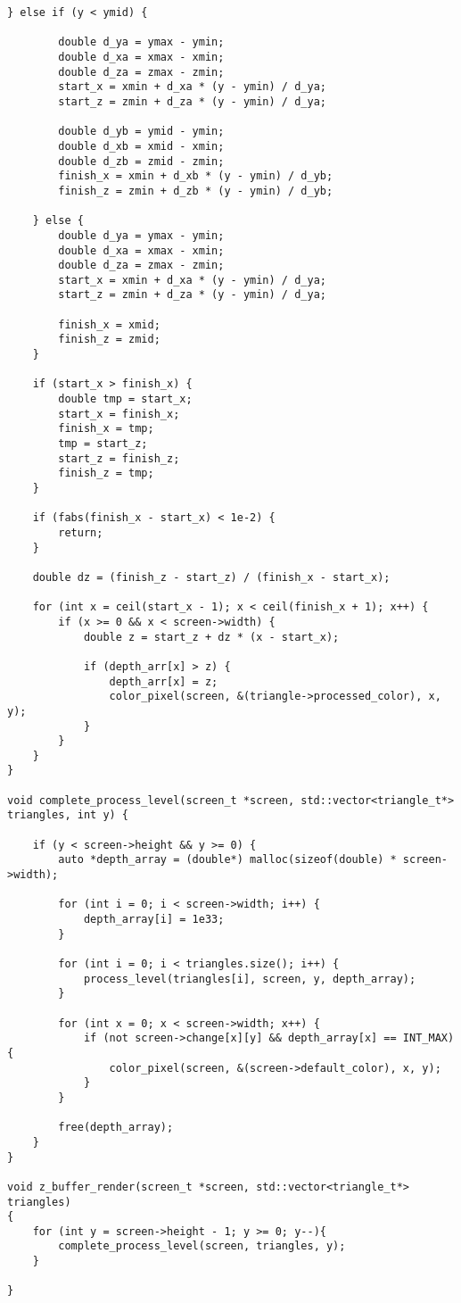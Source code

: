 \begin{lstlisting}[label=lst:lst1,caption=Алгоритм постолбцового Z-буффера]
    } else if (y < ymid) {

        double d_ya = ymax - ymin;
        double d_xa = xmax - xmin;
        double d_za = zmax - zmin;
        start_x = xmin + d_xa * (y - ymin) / d_ya;
        start_z = zmin + d_za * (y - ymin) / d_ya;

        double d_yb = ymid - ymin;
        double d_xb = xmid - xmin;
        double d_zb = zmid - zmin;
        finish_x = xmin + d_xb * (y - ymin) / d_yb;
        finish_z = zmin + d_zb * (y - ymin) / d_yb;

    } else {
        double d_ya = ymax - ymin;
        double d_xa = xmax - xmin;
        double d_za = zmax - zmin;
        start_x = xmin + d_xa * (y - ymin) / d_ya;
        start_z = zmin + d_za * (y - ymin) / d_ya;

        finish_x = xmid;
        finish_z = zmid;
    }

    if (start_x > finish_x) {
        double tmp = start_x;
        start_x = finish_x;
        finish_x = tmp;
        tmp = start_z;
        start_z = finish_z;
        finish_z = tmp;
    }

    if (fabs(finish_x - start_x) < 1e-2) {
        return;
    }

    double dz = (finish_z - start_z) / (finish_x - start_x);

    for (int x = ceil(start_x - 1); x < ceil(finish_x + 1); x++) {
        if (x >= 0 && x < screen->width) {
            double z = start_z + dz * (x - start_x);

            if (depth_arr[x] > z) {
                depth_arr[x] = z;
                color_pixel(screen, &(triangle->processed_color), x, y);
            }
        }
    }
}

void complete_process_level(screen_t *screen, std::vector<triangle_t*> triangles, int y) {

    if (y < screen->height && y >= 0) {
        auto *depth_array = (double*) malloc(sizeof(double) * screen->width);

        for (int i = 0; i < screen->width; i++) {
            depth_array[i] = 1e33;
        }

        for (int i = 0; i < triangles.size(); i++) {
            process_level(triangles[i], screen, y, depth_array);
        }

        for (int x = 0; x < screen->width; x++) {
            if (not screen->change[x][y] && depth_array[x] == INT_MAX) {
                color_pixel(screen, &(screen->default_color), x, y);
            }
        }

        free(depth_array);
    }
}

void z_buffer_render(screen_t *screen, std::vector<triangle_t*> triangles)
{
    for (int y = screen->height - 1; y >= 0; y--){
        complete_process_level(screen, triangles, y);
    }

}
\end{lstlisting}

